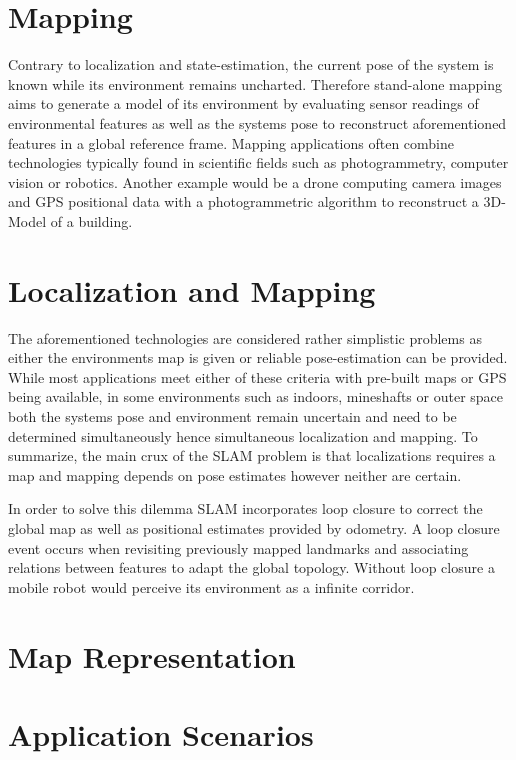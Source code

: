 \section{Mapping}
Contrary to localization and state-estimation, the current pose of the system is known while its environment remains uncharted.
Therefore stand-alone mapping aims to generate a model of its environment by evaluating sensor readings of environmental features as well as the systems pose to reconstruct aforementioned features in a global reference frame. 
Mapping applications often combine technologies typically found in scientific fields such as photogrammetry, computer vision or robotics. 
Another example would be a drone computing camera images and GPS positional data with a photogrammetric algorithm to reconstruct a 3D-Model of a building. 


\section{Localization and Mapping}
The aforementioned technologies are considered rather simplistic problems as either the environments map is given or reliable pose-estimation can be provided. While most applications meet either of these criteria with pre-built maps or GPS being available, in some environments such as indoors, mineshafts or outer space both the systems pose and environment remain uncertain and need to be determined simultaneously hence simultaneous localization and mapping. 
To summarize, the main crux of the SLAM problem is that localizations requires a map and mapping depends on pose estimates however neither are certain. 

In order to solve this dilemma SLAM incorporates loop closure to correct the global map as well as positional estimates provided by odometry. A loop closure event occurs when revisiting previously mapped landmarks and associating relations between features to adapt the global topology. Without loop closure a mobile robot would perceive its environment as a infinite corridor.

\section{Map Representation}


\section{Application Scenarios}

